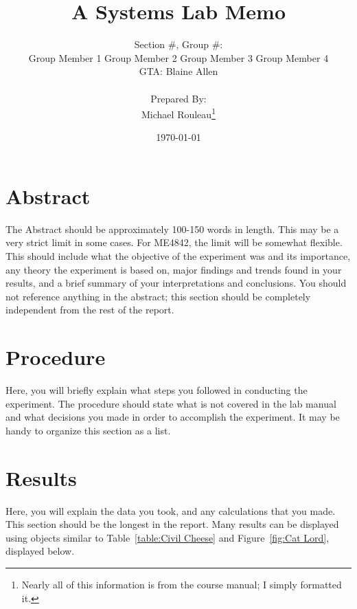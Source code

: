 \documentclass[11pt,letter]{report}
\title{\Huge{A Systems Lab Memo}}
\author{Section \#, Group \#: \\
  Group Member 1 \quad Group Member 2 \quad Group Member 3 \quad Group Member 4 \\ GTA: Blaine Allen \\\\ Prepared By: \\ Michael Rouleau\thanks{Nearly all of this information is from the course manual\cite{Stutts}; I simply formatted it.}}
\date{\today}
\begin{document}
\maketitle

\section*{Abstract}
The Abstract should be approximately 100-150 words in length. This may be a very strict limit in some cases. For ME4842, the limit will be somewhat flexible. This should include what the objective of the experiment was and its importance, any theory the experiment is based on, major findings and trends found in your results, and a brief summary of your interpretations and conclusions. You should not reference anything in the abstract; this section should be completely independent from the rest of the report.

\section*{Procedure}
Here, you will briefly explain what steps you followed in conducting the experiment. The procedure should state what is not covered in the lab manual and what decisions you made in order to accomplish the experiment. It may be handy to organize this section as a list.

\section*{Results}
Here, you will explain the data you took, and any calculations that you made. This section should be the longest in the report. Many results can be displayed using objects similar to Table~\ref{table:Civil Cheese} and Figure~\ref{fig:Cat Lord}, displayed below.

\end{document}
